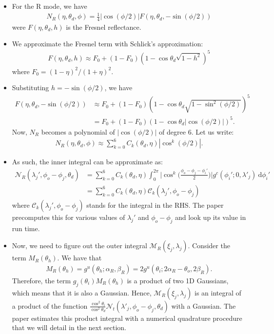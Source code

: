 \documentclass[10pt]{article}
\newcommand{\dee}{\mathrm{d}}
\newcommand{\modeint}{\mathcal{M}}
\newcommand{\azimint}{\mathcal{N}}
\begin{document}
  \begin{itemize}
    \item For the R mode, we have
      \begin{align*}
        N_R(\eta, \theta_d, \phi) = \frac{1}{4} |\cos(\phi/2)| F(\eta, \theta_d, -\sin(\phi/2))        
      \end{align*}
      were $F(\eta, \theta_d, h)$ is the Fresnel reflectance.
      
    \item We approximate the Fresnel term with Schlick's approximation:
    \begin{align*}
      F(\eta, \theta_d, h) \approx F_0 + (1 - F_0) (1 - \cos \theta_d \sqrt{1 - h^2})^5
    \end{align*}
    where $F_0 = (1 - \eta)^2/(1 + \eta)^2$.
      
    \item Substituting $h = -\sin(\phi/2)$, we have
    \begin{align*}
      F(\eta, \theta_d, -\sin(\phi/2)) 
      &\approx F_0 + (1 - F_0)(1 - \cos \theta_d \sqrt{1 - \sin^2(\phi/2)})^5\\
      &= F_0 + (1 - F_0)(1 - \cos \theta_d |\cos (\phi/2)|)^5.
    \end{align*}
    Now, $N_R$ becomes a polynomial of $|\cos(\phi/2)|$ of degree 6. Let us write:
    \begin{align*}
      N_R(\eta, \theta_d, \phi) \approx \sum_{k=0}^6 C_k(\theta_d, \eta) | \cos^k (\phi/2) |.
    \end{align*}
    
    \item As such, the inner integral can be approximate as:
    \begin{align*}
      \azimint_R(\lambda_j', \phi_o - \phi_j, \theta_d)
      &= \sum_{k=0}^6 C_k(\theta_d, \eta) \int_0^{2\pi} \bigg| \cos^k \bigg( \frac{\phi_o - \phi_j - \phi_i'}{2} \bigg) \bigg| g^c(\phi_i'; 0, \lambda'_j)\ \dee \phi_i'\\
      &= \sum_{k=0}^6 C_k(\theta_d, \eta) \mathcal{C}_k(\lambda_j', \phi_o - \phi_j)
    \end{align*}
    where $\mathcal{C}_k(\lambda_j', \phi_o - \phi_j)$ stands for the integral in the RHS. The paper precomputes this for various values of $\lambda_j'$ and $\phi_o - \phi_j$ and look up its value in run time.
    
    \item Now, we need to figure out the outer integral $\modeint_R(\xi_j, \lambda_j)$. Consider the term $M_R(\theta_h)$. We have that
    \begin{align*}
      M_R(\theta_h) = g^u(\theta_h; \alpha_R, \beta_R) = 2g^u(\theta_i; 2\alpha_R - \theta_o, 2\beta_R).
    \end{align*}
    Therefore, the term $g_j(\theta_i) M_R(\theta_h)$ is a product of two 1D Gaussians, which means that it is also a Gaussian. Hence, $\modeint_R(\xi_j, \lambda_j)$ is an integral of a product of the function $\frac{\cos^2 \theta_i}{\cos^2 \theta_d} \azimint_t(\lambda'_j, \phi_o-\phi_j, \theta_d)$ with a Gaussian. The paper estimates this product integral with a numerical quadrature procedure that we will detail in the next section.
  \end{itemize}
  
\end{document}
